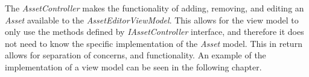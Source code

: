 The \textit{AssetController} makes the functionality of adding, removing, and editing an \textit{Asset} available to the \textit{AssetEditorViewModel}. This allows for the view model to only use the methods defined by \textit{IAssetController} interface, and therefore it does not need to know the specific implementation of the \textit{Asset} model. This in return allows for separation of concerns, and functionality. An example of the implementation of a view model can be seen in the following chapter.
